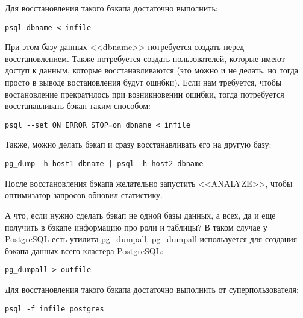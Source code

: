 Для восстановления такого бэкапа достаточно выполнить:
\begin{lstlisting}[label=lst:backups2,caption=Восстанавливаем бэкап]
psql dbname < infile
\end{lstlisting}

При этом базу данных <<dbname>> потребуется создать перед восстановлением. Также потребуется создать пользователей, 
которые имеют доступ к данным, которые восстанавливаются (это можно и не делать, но тогда просто в выводе востановления будут ошибки).
Если нам требуется, чтобы востановление прекратилось при возникновении ошибки, тогда потребуется восстанавливать бэкап таким способом:
\begin{lstlisting}[label=lst:backups3,caption=Восстанавливаем бэкап]
psql --set ON_ERROR_STOP=on dbname < infile
\end{lstlisting}

Также, можно делать бэкап и сразу восстанавливать его на другую базу:
\begin{lstlisting}[label=lst:backups4,caption=Бекап в другую БД]
pg_dump -h host1 dbname | psql -h host2 dbname
\end{lstlisting}

После восстановления бэкапа желательно запустить <<ANALYZE>>, чтобы оптимизатор запросов обновил статистику.

А что, если нужно сделать бэкап не одной базы данных, а всех, да и еще получить в бэкапе информацию про роли и таблицы? 
В таком случае у PostgreSQL есть утилита pg\_dumpall. pg\_dumpall используется для создания бэкапа данных всего кластера PostgreSQL:
\begin{lstlisting}[label=lst:backups5,caption=Бекап кластера PostgreSQL]
pg_dumpall > outfile
\end{lstlisting}

Для восстановления такого бэкапа достаточно выполнить от суперпользователя:
\begin{lstlisting}[label=lst:backups6,caption=Восстановления бэкапа PostgreSQL]
psql -f infile postgres
\end{lstlisting}

